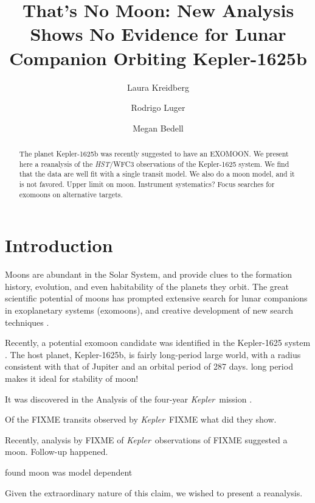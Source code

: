 \documentclass[twocolumn]{aastex62}
\newcommand{\project}[1]{\textsl{#1}}
\newcommand{\HST}{\project{HST}}
\newcommand{\Kepler}{\project{Kepler}}
\begin{document}
\title{That's No Moon: New Analysis Shows No Evidence for Lunar Companion Orbiting Kepler-1625b}

\author{Laura Kreidberg}
\author{Rodrigo Luger}
\author{Megan Bedell}

\begin{abstract}
The planet Kepler-1625b was recently suggested to have an EXOMOON. We present here a reanalysis of the \HST/WFC3 observations of the Kepler-1625 system. We find that the data are well fit with a single transit model. We also do a moon model, and it is not favored. Upper limit on moon. Instrument systematics? Focus searches for exomoons on alternative targets.
\end{abstract}


\section{Introduction} \label{sec:intro}
Moons are abundant in the Solar System, and provide clues to the formation history, evolution, and even habitability of the planets they orbit. The great scientific potential of moons has prompted extensive search for lunar companions in exoplanetary systems (exomoons), and creative development of new search techniques \citep[e.g.][]{kipping09a, kipping09b, kipping13, simon10, peters13, heller14, noyola14, hippke15, agol15, sengupta16, vanderburg18}. 

Recently, a potential exomoon candidate was identified in the Kepler-1625 system \citep{teachey18a}. The host planet, Kepler-1625b, is fairly long-period large world, with a radius consistent with that of Jupiter and an orbital period of 287 days. 
long period makes it ideal for stability of moon!

It was discovered in the Analysis of the four-year \Kepler\ mission  \citep{teachey18}.

Of the FIXME transits observed by \Kepler\, FIXME what did they show.  

Recently, analysis by FIXME of \Kepler\ observations of FIXME suggested a moon. Follow-up happened.

\citep{rodenbeck18} found moon was model dependent

Given the extraordinary nature of this claim, we wished to present a reanalysis. 
\end{document}
